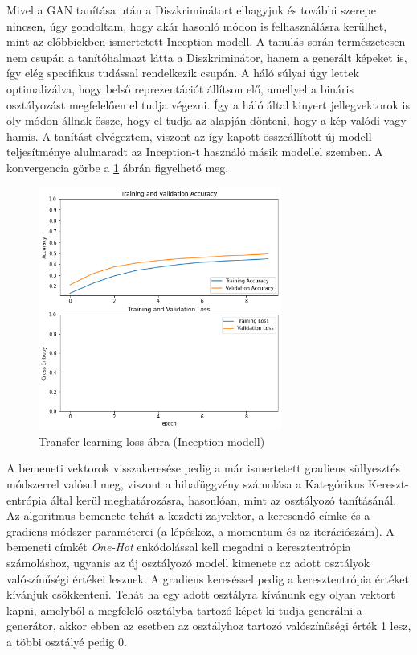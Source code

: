 
Mivel a GAN tanítása után a Diszkriminátort elhagyjuk és további szerepe nincsen, úgy gondoltam, hogy akár hasonló módon is felhasználásra kerülhet, mint az előbbiekben ismertetett Inception modell. A tanulás során természetesen nem csupán a tanítóhalmazt látta a Diszkriminátor, hanem a generált képeket is, így elég specifikus tudással rendelkezik csupán. A háló súlyai úgy lettek optimalizálva, hogy belső reprezentációt állítson elő, amellyel a bináris osztályozást megfelelően el tudja végezni. Így a háló által kinyert jellegvektorok is oly módon állnak össze, hogy el tudja az alapján dönteni, hogy a kép valódi vagy hamis. A tanítást elvégeztem, viszont az így kapott összeállított új modell teljesítménye alulmaradt az Inception-t használó másik modellel szemben. A konvergencia görbe a \ref{fig:transfer_learning_loss_discriminator} ábrán figyelhető meg.

\begin{figure}[h]
	\centering
	\includegraphics[width=8cm]{images/transfer_discriminator.png}
	\caption{Transfer-learning loss ábra (Inception modell)}
	\label{fig:transfer_learning_loss_discriminator}
\end{figure}

A bemeneti vektorok visszakeresése pedig a már ismertetett gradiens süllyesztés módszerrel valósul meg, viszont a hibafüggvény számolása a Kategórikus Kereszt-entrópia által kerül meghatározásra, hasonlóan, mint az osztályozó tanításánál. Az algoritmus bemenete tehát a kezdeti zajvektor, a keresendő címke és a gradiens módszer paraméterei (a lépésköz, a momentum és az iterációszám).
A bemeneti címkét \textit{One-Hot} enkódolással kell megadni a keresztentrópia számoláshoz, ugyanis az új osztályozó modell kimenete az adott osztályok valószínűségi értékei lesznek. A gradiens kereséssel pedig a keresztentrópia értéket kívánjuk csökkenteni. Tehát ha egy adott osztályra kívánunk egy olyan vektort kapni, amelyből a megfelelő osztályba tartozó képet ki tudja generálni a generátor, akkor ebben az esetben az osztályhoz tartozó valószínűségi érték 1 lesz, a többi osztályé pedig 0.

